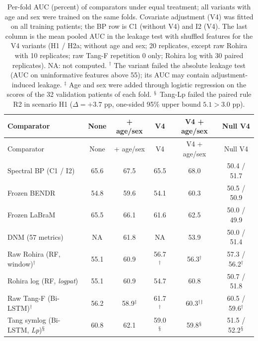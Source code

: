 {\scriptsize
\setlength{\tabcolsep}{3pt}
\begin{longtable}{p{}ccccc}
\caption{Per-fold AUC (percent) of comparators under equal treatment; all variants with age and sex were trained on the same folds. Covariate adjustment (V4) was fitted on all training patients; the BP row is C1 (without V4) and I2 (V4). The last column is the mean pooled AUC in the leakage test with shuffled features for the V4 variants (H1 / H2a; without age and sex; 20 replicates, except raw Rohira with 10 replicates; raw Tang-F repetition 0 only; Rohira log with 30 paired replicates). NA: not computed. $^\dagger$ The variant failed the absolute leakage test (AUC on uninformative features above 55); its AUC may contain adjustment-induced leakage. $^\ddagger$ Age and sex were added through logistic regression on the scores of the 32 validation patients of each fold. $^\mathsection$ Tang-Lp failed the paired rule R2 in scenario H1 ($\Delta = +3.7$ pp, one-sided 95\% upper bound $5.1 > 3.0$ pp).}\label{tab:setara}\\
\toprule
Comparator & None & + age/sex & V4 & V4 + age/sex & Null V4 \\
\midrule
\endfirsthead
\toprule
Comparator & None & + age/sex & V4 & V4 + age/sex & Null V4 \\
\midrule
\endhead
\bottomrule
\endfoot
Spectral BP (C1 / I2) & 65.6 & 67.5 & 65.5 & 68.0 & 50.4 / 51.7 \\
Frozen BENDR & 54.8 & 59.6 & 54.1 & 60.3 & 50.5 / 50.9 \\
Frozen LaBraM & 65.5 & 66.1 & 61.6 & 62.5 & 50.0 / 49.9 \\
DNM (57 metrics) & NA & 61.8 & NA & 53.9 & 50.0 / 51.4 \\
Raw Rohira (RF, window)$^\dagger$ & 55.1 & 60.9 & 56.7$^\dagger$ & 56.3$^\dagger$ & 57.3 / 56.2$^\dagger$ \\
Rohira log (RF, \textit{logpat}) & 55.1 & 60.9 & 54.7 & 60.8 & 50.7 / 51.8 \\
Raw Tang-F (Bi-LSTM)$^\dagger$ & 56.2 & 58.9$^\ddagger$ & 61.7$^\dagger$ & 60.3$^\dagger$$^\ddagger$ & 60.5 / 59.6$^\dagger$ \\
Tang symlog (Bi-LSTM, \textit{Lp})$^\mathsection$ & 60.8 & 62.1 & 59.0$^\mathsection$ & 59.8$^\mathsection$ & 51.5 / 52.2$^\mathsection$ \\
\end{longtable}
}


